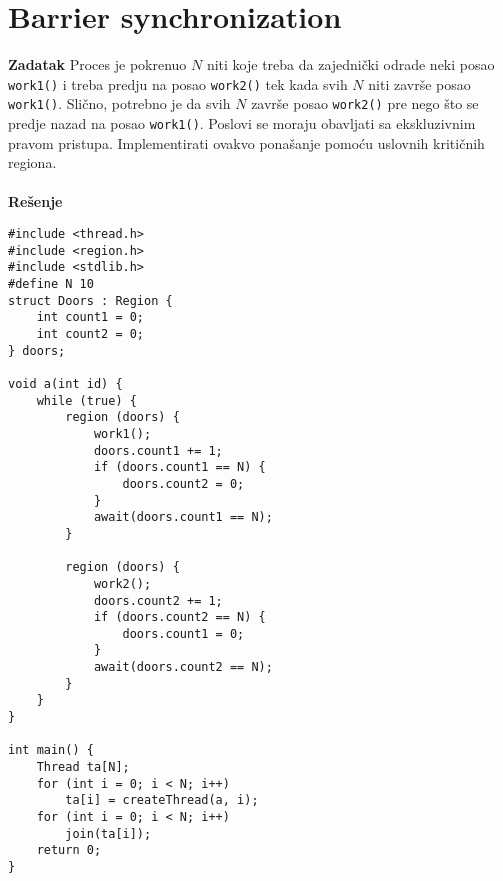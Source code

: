 \clearpage
\section{\latin Barrier synchronization}
\textbf{\large Zadatak} Proces je pokrenuo $N$ niti koje treba da zajedni\v{c}ki odrade neki posao \texttt{work1()} i treba predju na posao \texttt{work2()} tek kada svih $N$ niti zavr\v{s}e posao \texttt{work1()}. Sli\v{c}no, potrebno je da svih $N$ zavr\v{s}e posao \texttt{work2()} pre nego \v{s}to se predje nazad na posao \texttt{work1()}. Poslovi se moraju obavljati sa ekskluzivnim pravom pristupa. Implementirati ovakvo pona\v{s}anje pomo\'{c}u uslovnih kriti\v{c}nih regiona.
\\\\
\textbf{\large Re\v{s}enje}
\begin{lstlisting}
#include <thread.h>
#include <region.h>
#include <stdlib.h>
#define N 10
struct Doors : Region {
    int count1 = 0;
    int count2 = 0;
} doors;

void a(int id) {
    while (true) {
        region (doors) {
			work1();
            doors.count1 += 1;
            if (doors.count1 == N) {
                doors.count2 = 0;
            }
            await(doors.count1 == N);
        }

        region (doors) {
			work2();
            doors.count2 += 1;
            if (doors.count2 == N) {
                doors.count1 = 0;
            }
            await(doors.count2 == N);
        }
    }
}

int main() {
    Thread ta[N];
    for (int i = 0; i < N; i++) 
        ta[i] = createThread(a, i);
    for (int i = 0; i < N; i++) 
        join(ta[i]);
    return 0;
}

\end{lstlisting}
